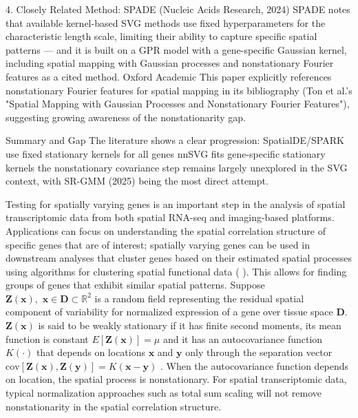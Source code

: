 \documentclass[pdflatex,sn-mathphys-num]{sn-jnl}%
\theoremstyle{thmstyleone}%
\theoremstyle{thmstyletwo}%
\theoremstyle{thmstylethree}%
\begin{document}
4. Closely Related Method: SPADE (Nucleic Acids Research, 2024)
SPADE notes that available kernel-based SVG methods use fixed hyperparameters for the characteristic length scale, limiting their ability to capture specific spatial patterns — and it is built on a GPR model with a gene-specific Gaussian kernel, including spatial mapping with Gaussian processes and nonstationary Fourier features as a cited method. Oxford Academic This paper explicitly references nonstationary Fourier features for spatial mapping in its bibliography (Ton et al.'s "Spatial Mapping with Gaussian Processes and Nonstationary Fourier Features"), suggesting growing awareness of the nonstationarity gap.

Summary and Gap
The literature shows a clear progression: SpatialDE/SPARK use fixed stationary kernels for all genes nnSVG fits gene-specific stationary kernels the nonstationary covariance step remains largely unexplored in the SVG context, with SR-GMM (2025) being the most direct attempt.


 Testing for spatially varying genes is an important step in the analysis of spatial transcriptomic data from both spatial RNA-seq and imaging-based platforms. Applications can focus on understanding the spatial correlation structure of specific genes that are of interest; spatially varying genes can be used in downstream analyses that cluster genes based on their estimated spatial processes using algorithms for clustering spatial functional data ( \cite{pan2024clustering}). This allows for finding groups of genes that exhibit similar spatial patterns.
Suppose $\mathbf{Z}(\mathbf{x}),\,\, \mathbf{x} \in \mathbf{D} \subset \mathbb{R}^{2}$ is a random field representing the residual spatial component of variability for normalized expression of a gene over tissue space $\mathbf{D}$. $\mathbf{Z}(\mathbf{x})$ is said to be weakly stationary if it has finite second moments, its mean function is constant $E[\mathbf{Z}(\mathbf{x})] = \mu$ and it has an autocovariance function $K(\cdot)$ that depends on locations $\mathbf{x}$ and $\mathbf{y}$ only through the separation vector $\text{cov}[\mathbf{Z}(\mathbf{x}), \mathbf{Z}(\mathbf{y})] = K(\mathbf{x}-\mathbf{y})$ \cite{stein1999interpolation}.
When the autocovariance function depends on location, the spatial process is nonstationary. For spatial transcriptomic data, typical normalization approaches such as total sum scaling will not remove nonstationarity in the spatial correlation structure. %
\end{document}
